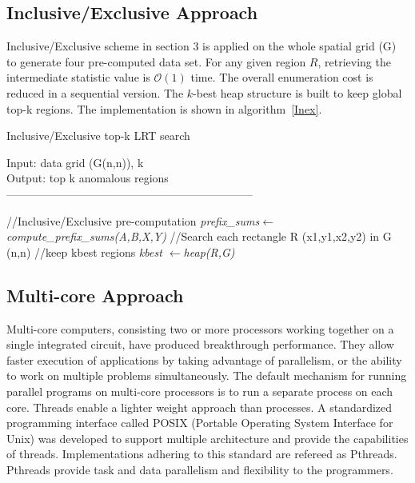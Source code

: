 \documentclass[AMA,LATO1COL]{WileyNJD-v2-bak}
\newcommand\bigo{\mathcal O}
\begin{document}
\subsection{Inclusive/Exclusive Approach}
Inclusive/Exclusive scheme in section 3 is applied on the whole spatial grid (G) to generate four pre-computed data set. For any given region $R$, retrieving the intermediate statistic value is $\bigo(1)$ time. The overall enumeration cost is reduced in a sequential version. The $k$-best heap structure is built to keep global top-k regions. The implementation is shown in algorithm~\ref{Inex}.
\begin{algorithm}[t!]
\label{algobr1}
\caption{Inclusive/Exclusive top-k LRT search}\label{Inex}
Input: data grid (G(n,n)), k\\
Output: top k anomalous regions\\
------------------------------------------------------------------ \\
\begin{algorithmic}[1]
\State //Inclusive/Exclusive pre-computation
\State \textit  {prefix\_sums\(\leftarrow\)compute\_prefix\_sums(A,B,X,Y)}
\State //Search each rectangle R (x1,y1,x2,y2) in G (n,n)
\State //keep kbest regions
\State \textit {kbest \(\leftarrow\)heap(R,G)}
\EndFor
\EndFor
\EndFor
\EndFor
\end{algorithmic}
\end{algorithm}

\subsection{Multi-core Approach}
Multi-core computers, consisting two or more processors working together on a single integrated circuit, have produced breakthrough performance. They allow faster execution of applications by taking advantage of parallelism, or the ability to work on multiple problems simultaneously. The default mechanism for running parallel programs on multi-core processors is to run a separate process on each core. Threads enable a lighter weight approach than processes. A standardized programming interface called POSIX (Portable Operating System Interface for Unix) was developed to support multiple architecture and provide the capabilities of threads. Implementations adhering to this standard are refereed as Pthreads. Pthreads provide task and data parallelism and flexibility to the programmers.
\end{document}
